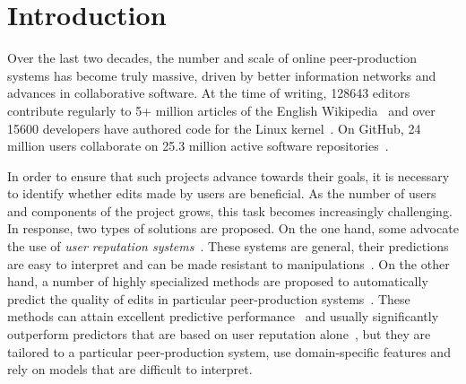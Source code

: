 \section{Introduction}
\label{pps:sec:intro}

Over the last two decades, the number and scale of online peer-production systems has become truly massive, driven by better information networks and advances in collaborative software.
At the time of writing, \num{128643} editors contribute regularly to \num{5}+ million articles of the English Wikipedia~\citep{wikipedia2017wikipedians} and over \num{15600} developers have authored code for the Linux kernel~\citep{corbet2017linux}.
On GitHub, \num{24} million users collaborate on \num{25.3} million active software repositories~\citep{github2017octoverse}.

In order to ensure that such projects advance towards their goals, it is necessary to identify whether edits made by users are beneficial.
As the number of users and components of the project grows, this task becomes increasingly challenging.
In response, two types of solutions are proposed.
On the one hand, some advocate the use of \emph{user reputation systems}~\citep{resnick2000reputation, adler2007content}.
These systems are general, their predictions are easy to interpret and can be made resistant to manipulations~\citep{dealfaro2013content}.
On the other hand, a number of highly specialized methods are proposed to automatically predict the quality of edits in particular peer-production systems~\citep{druck2008learning, wikimedia2015artificial}.
These methods can attain excellent predictive performance~\citep{heindorf2016vandalism} and usually significantly outperform predictors that are based on user reputation alone~\citep{druck2008learning}, but they are tailored to a particular peer-production system, use domain-specific features and rely on models that are difficult to interpret.

